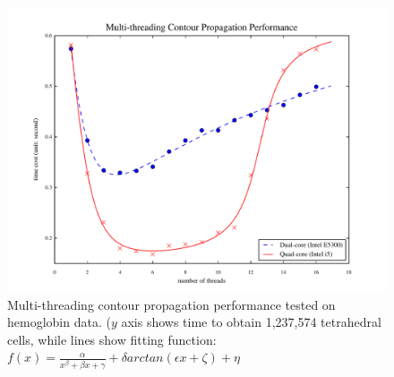 \documentclass[11pt, b5paper]{report}
\begin{document}

\begin{figure}[h!]
  \centering
  \includegraphics[width=\textwidth-1in]{images/fig-perf-plot.pdf}
  \caption[Multi-threading Contour Propagation Performance]
  {Multi-threading contour propagation performance tested on hemoglobin data.
    ($y$ axis shows time to obtain 1,237,574 tetrahedral cells, while
    lines show fitting function: 
  $f(x) = \frac{\alpha}{x^\beta + \beta x + \gamma} + \delta  arctan (\epsilon  x+\zeta)+\eta$}
  \label{fig:threading1}
\end{figure}


\end{document}
